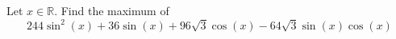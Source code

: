 Let $x \in \mathbb{R}$. Find the maximum of \[
244\sin^2(x)+36\sin(x)+96\sqrt{3}\cos(x)-64\sqrt{3}\sin(x)\cos(x)
\]
